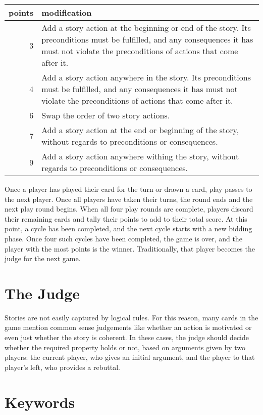 \documentclass[12pt]{article}
\begin{document}
\vspace{1em}
\begin{tabular}{r|p{5in}}
points & modification \\
\midrule
3 & Add a story action at the beginning or end of the story. Its preconditions must be fulfilled, and any consequences it has must not violate the preconditions of actions that come after it. \\
4 & Add a story action anywhere in the story. Its preconditions must be fulfilled, and any consequences it has must not violate the preconditions of actions that come after it. \\
6 & Swap the order of two story actions. \\
7 & Add a story action at the end or beginning of the story, without regards to preconditions or consequences. \\
9 & Add a story action anywhere withing the story, without regards to preconditions or consequences. \\
\end{tabular}
\vspace{0.3em}

Once a player has played their card for the turn or drawn a card, play passes to the next player.
%
Once all players have taken their turns, the round ends and the next play round begins.
%
When all four play rounds are complete, players discard their remaining cards and tally their points to add to their total score.
%
At this point, a cycle has been completed, and the next cycle starts with a new bidding phase.
%
Once four such cycles have been completed, the game is over, and the player with the most points is the winner.
%
Traditionally, that player becomes the judge for the next game.

\section{The Judge}

Stories are not easily captured by logical rules.
%
For this reason, many cards in the game mention common sense judgements like whether an action is motivated or even just whether the story is coherent.
%
In these cases, the judge should decide whether the required property holds or not, based on arguments given by two players: the current player, who gives an initial argument, and the player to that player's left, who provides a rebuttal.

\section{Keywords}
\end{document}
